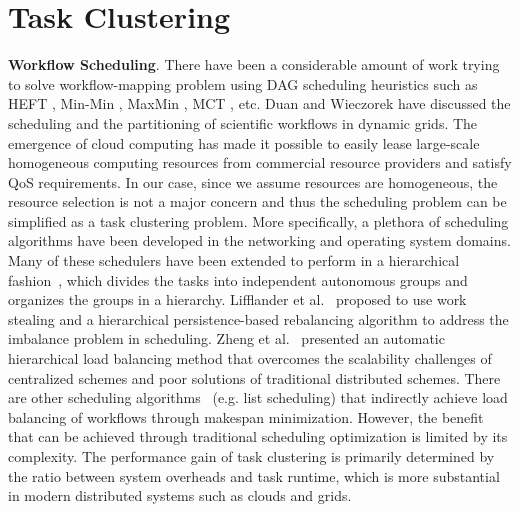 \section{Task Clustering}

\textbf{Workflow Scheduling}. There have been a considerable amount of work trying to solve workflow-mapping problem using DAG scheduling heuristics such as HEFT \cite{Topcuoglu2002}, Min-Min \cite{Blythe2005}, MaxMin \cite{Braun2001}, MCT \cite{Braun2001}, etc. Duan \cite{Rubing2005} and Wieczorek \cite{Wieczorek2005} have discussed the scheduling and the partitioning of scientific workflows in dynamic grids. The emergence of cloud computing \cite{Armbrust2009} has made it possible to easily lease large-scale homogeneous computing resources from commercial resource providers and satisfy QoS requirements. In our case, since we assume resources are homogeneous, the resource selection is not a major concern and thus the scheduling problem can be simplified as a task clustering problem. 
More specifically, a plethora of  scheduling algorithms have been developed in the networking and operating system domains. Many of these schedulers have been extended to perform in a hierarchical fashion~\cite{Lifflander2012}, which divides the tasks into independent autonomous groups and organizes the groups in a hierarchy. Lifflander et al.~\cite{Lifflander2012} proposed to use work stealing and a hierarchical persistence-based rebalancing algorithm to address the imbalance problem in scheduling. Zheng et al.~\cite{Zheng2011} presented an automatic hierarchical load balancing method that overcomes the scalability challenges of centralized schemes and poor solutions of traditional distributed schemes. There are other scheduling algorithms~\cite{Braun2001} (e.g. list scheduling) that indirectly achieve load balancing of workflows through makespan minimization. However, the benefit that can be achieved through traditional scheduling optimization is limited by its complexity. The performance gain of task clustering is primarily determined by the ratio between system overheads and task runtime, which is more substantial in modern distributed systems such as clouds and grids. 

